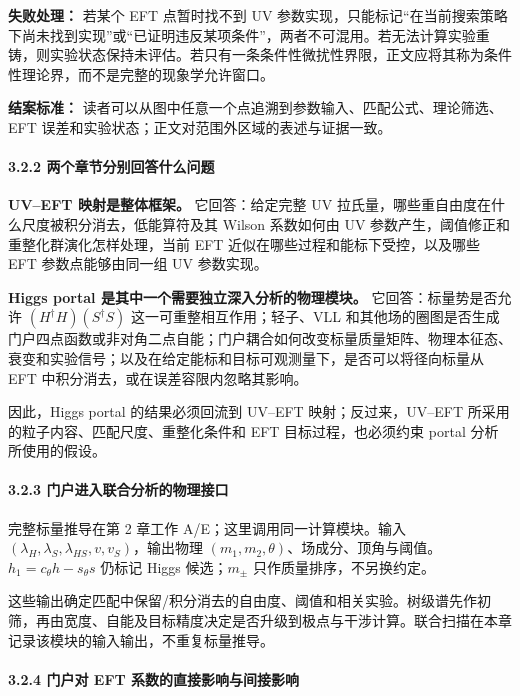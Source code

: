 \documentclass[
]{article}
\begin{document}
\textbf{失败处理：} 若某个 EFT 点暂时找不到 UV
参数实现，只能标记``在当前搜索策略下尚未找到实现''或``已证明违反某项条件''，两者不可混用。若无法计算实验重铸，则实验状态保持未评估。若只有一条条件性微扰性界限，正文应将其称为条件性理论界，而不是完整的现象学允许窗口。

\textbf{结案标准：}
读者可以从图中任意一个点追溯到参数输入、匹配公式、理论筛选、EFT
误差和实验状态；正文对范围外区域的表述与证据一致。

\paragraph{3.2.2
两个章节分别回答什么问题}\label{ux4e24ux4e2aux7ae0ux8282ux5206ux522bux56deux7b54ux4ec0ux4e48ux95eeux9898}

\textbf{UV--EFT 映射是整体框架。} 它回答：给定完整 UV
拉氏量，哪些重自由度在什么尺度被积分消去，低能算符及其 Wilson 系数如何由
UV 参数产生，阈值修正和重整化群演化怎样处理，当前 EFT
近似在哪些过程和能标下受控，以及哪些 EFT 参数点能够由同一组 UV
参数实现。

\textbf{Higgs portal 是其中一个需要独立深入分析的物理模块。}
它回答：标量势是否允许 \((H^\dagger H)(S^\dagger S)\)
这一可重整相互作用；轻子、VLL
和其他场的圈图是否生成门户四点函数或非对角二点自能；门户耦合如何改变标量质量矩阵、物理本征态、衰变和实验信号；以及在给定能标和目标可观测量下，是否可以将径向标量从
EFT 中积分消去，或在误差容限内忽略其影响。

因此，Higgs portal 的结果必须回流到 UV--EFT 映射；反过来，UV--EFT
所采用的粒子内容、匹配尺度、重整化条件和 EFT 目标过程，也必须约束 portal
分析所使用的假设。

\paragraph{3.2.3
门户进入联合分析的物理接口}\label{ux95e8ux6237ux8fdbux5165ux8054ux5408ux5206ux6790ux7684ux7269ux7406ux63a5ux53e3}

完整标量推导在第 2 章工作 A/E；这里调用同一计算模块。输入
\((\lambda_H,\lambda_S,\lambda_{HS},v,v_S)\)，输出物理
\((m_1,m_2,\theta)\)、场成分、顶角与阈值。\(h_1=c_\theta h-s_\theta s\)
仍标记 Higgs 候选；\(m_\pm\) 只作质量排序，不另换约定。

这些输出确定匹配中保留/积分消去的自由度、阈值和相关实验。树级谱先作初筛，再由宽度、自能及目标精度决定是否升级到极点与干涉计算。联合扫描在本章记录该模块的输入输出，不重复标量推导。

\paragraph{3.2.4 门户对 EFT
系数的直接影响与间接影响}\label{ux95e8ux6237ux5bf9-eft-ux7cfbux6570ux7684ux76f4ux63a5ux5f71ux54cdux4e0eux95f4ux63a5ux5f71ux54cd}
\end{document}
